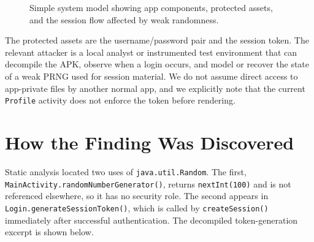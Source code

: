 \documentclass[letterpaper,twocolumn,10pt]{article}
\begin{document}
\begin{figure}[t]
\centering
{}
\caption{Simple system model showing app components, protected assets, and the session flow affected by weak randomness.}
\end{figure}

The protected assets are the username/password pair and the session token. The relevant attacker is a local analyst or instrumented test environment that can decompile the APK, observe when a login occurs, and model or recover the state of a weak PRNG used for session material. We do not assume direct access to app-private files by another normal app, and we explicitly note that the current \texttt{Profile} activity does not enforce the token before rendering.

\section{How the Finding Was Discovered}
Static analysis located two uses of \texttt{java.util.Random}. The first, \texttt{MainActivity.randomNumberGenerator()}, returns \texttt{nextInt(100)} and is not referenced elsewhere, so it has no security role. The second appears in \texttt{Login.generateSessionToken()}, which is called by \texttt{createSession()} immediately after successful authentication. The decompiled token-generation excerpt is shown below.
\end{document}
